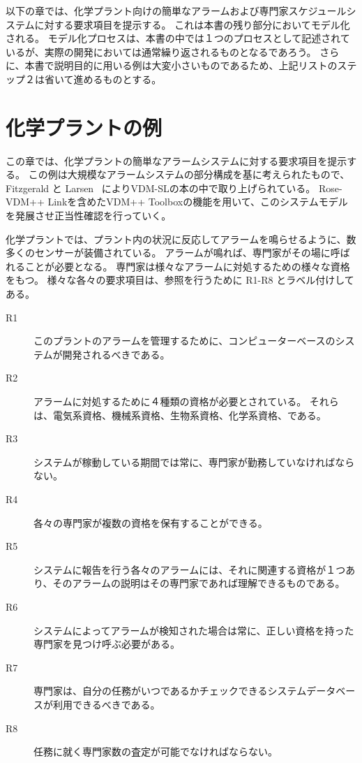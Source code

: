 \documentclass[\pformat,12pt,twoside]{jarticle}
\begin{document}
以下の章では、化学プラント向けの簡単なアラームおよび専門家スケジュールシステムに対する要求項目を提示する。
これは本書の残り部分においてモデル化される。
モデル化プロセスは、本書の中では１つのプロセスとして記述されているが、実際の開発においては通常繰り返されるものとなるであろう。
さらに、本書で説明目的に用いる例は大変小さいものであるため、上記リストのステップ２は省いて進めるものとする。

\section{化学プラントの例}

この章では、化学プラントの簡単なアラームシステムに対する要求項目を提示する。
この例は大規模なアラームシステムの部分構成を基に考えられたもので、Fitzgerald と Larsen \cite{Fitzgerald&98b}\ によりVDM-SLの本の中で取り上げられている。
Rose-VDM++ Linkを含めたVDM++ Toolboxの機能を用いて、このシステムモデルを発展させ正当性確認を行っていく。

化学プラントでは、プラント内の状況に反応してアラームを鳴らせるように、数多くのセンサーが装備されている。
アラームが鳴れば、専門家がその場に呼ばれることが必要となる。
専門家は様々なアラームに対処するための様々な資格をもつ。
様々な各々の要求項目は、参照を行うために R1-R8 とラベル付けしてある。

\begin{description}
\item[R1] このプラントのアラームを管理するために、コンピューターベースのシステムが開発されるべきである。
\item[R2] アラームに対処するために４種類の資格が必要とされている。
それらは、電気系資格、機械系資格、生物系資格、化学系資格、である。
\item[R3] システムが稼動している期間では常に、専門家が勤務していなければならない。
\item[R4] 各々の専門家が複数の資格を保有することができる。
\item[R5] システムに報告を行う各々のアラームには、それに関連する資格が１つあり、そのアラームの説明はその専門家であれば理解できるものである。
\item[R6] システムによってアラームが検知された場合は常に、正しい資格を持った専門家を見つけ呼ぶ必要がある。
\item[R7] 専門家は、自分の任務がいつであるかチェックできるシステムデータベースが利用できるべきである。
\item[R8] 任務に就く専門家数の査定が可能でなければならない。
\end{description}
\end{document}
